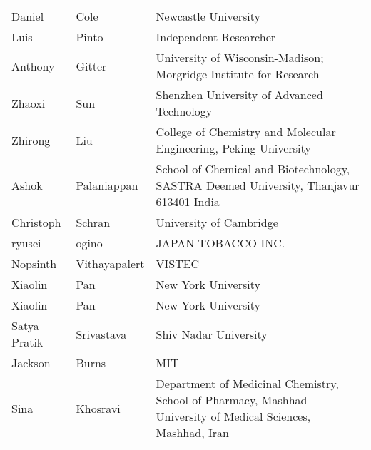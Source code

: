 \documentclass{article}
\begin{document}
\begin{table}[]
\begin{tabular}{lll}
\rowcolor[HTML]{FFFFFF} 
{\color[HTML]{434343} Daniel} & {\color[HTML]{434343} Cole} & {\color[HTML]{434343} Newcastle University} \\
\rowcolor[HTML]{F8F9FA} 
{\color[HTML]{434343} Luis} & {\color[HTML]{434343} Pinto} & {\color[HTML]{434343} Independent Researcher} \\
\rowcolor[HTML]{FFFFFF} 
{\color[HTML]{434343} Anthony} & {\color[HTML]{434343} Gitter} & {\color[HTML]{434343} University of Wisconsin-Madison; Morgridge Institute for Research} \\
\rowcolor[HTML]{F8F9FA} 
{\color[HTML]{434343} Zhaoxi} & {\color[HTML]{434343} Sun} & {\color[HTML]{434343} Shenzhen University of Advanced Technology} \\
\rowcolor[HTML]{FFFFFF} 
{\color[HTML]{434343} Zhirong} & {\color[HTML]{434343} Liu} & {\color[HTML]{434343} College of Chemistry and Molecular Engineering, Peking University} \\
\rowcolor[HTML]{F8F9FA} 
{\color[HTML]{434343} Ashok} & {\color[HTML]{434343} Palaniappan} & {\color[HTML]{434343} School of Chemical and Biotechnology, SASTRA Deemed University, Thanjavur 613401 India} \\
\rowcolor[HTML]{FFFFFF} 
{\color[HTML]{434343} Christoph} & {\color[HTML]{434343} Schran} & {\color[HTML]{434343} University of Cambridge} \\
\rowcolor[HTML]{F8F9FA} 
{\color[HTML]{434343} ryusei} & {\color[HTML]{434343} ogino} & {\color[HTML]{434343} JAPAN TOBACCO INC.} \\
\rowcolor[HTML]{FFFFFF} 
{\color[HTML]{434343} Nopsinth} & {\color[HTML]{434343} Vithayapalert} & {\color[HTML]{434343} VISTEC} \\
\rowcolor[HTML]{F8F9FA} 
{\color[HTML]{434343} Xiaolin} & {\color[HTML]{434343} Pan} & {\color[HTML]{434343} New York University} \\
\rowcolor[HTML]{FFFFFF} 
{\color[HTML]{434343} Xiaolin} & {\color[HTML]{434343} Pan} & {\color[HTML]{434343} New York University} \\
\rowcolor[HTML]{F8F9FA} 
{\color[HTML]{434343} Satya Pratik} & {\color[HTML]{434343} Srivastava} & {\color[HTML]{434343} Shiv Nadar University} \\
\rowcolor[HTML]{FFFFFF} 
{\color[HTML]{434343} Jackson} & {\color[HTML]{434343} Burns} & {\color[HTML]{434343} MIT} \\
\rowcolor[HTML]{F8F9FA} 
{\color[HTML]{434343} Sina} & {\color[HTML]{434343} Khosravi} & {\color[HTML]{434343} Department of Medicinal Chemistry, School of Pharmacy, Mashhad University of Medical Sciences, Mashhad, Iran} \\

\end{tabular}
\end{table}
\end{document}
